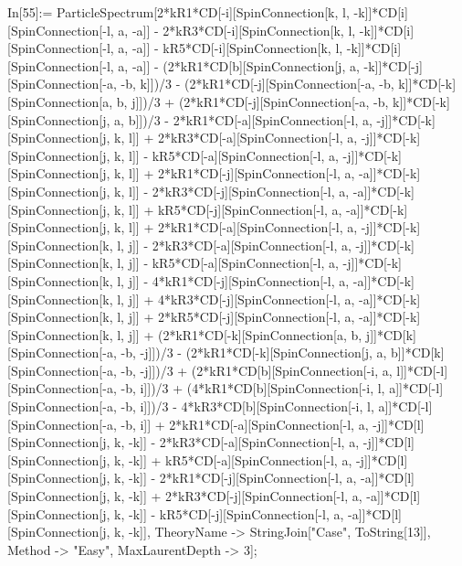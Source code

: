 In[55]:= ParticleSpectrum[2*kR1*CD[-i][SpinConnection[k, l, -k]]*CD[i][SpinConnection[-l, a, -a]] - 2*kR3*CD[-i][SpinConnection[k, l, -k]]*CD[i][SpinConnection[-l, a, -a]] - kR5*CD[-i][SpinConnection[k, l, -k]]*CD[i][SpinConnection[-l, a, -a]] - (2*kR1*CD[b][SpinConnection[j, a, -k]]*CD[-j][SpinConnection[-a, -b, k]])/3 - (2*kR1*CD[-j][SpinConnection[-a, -b, k]]*CD[-k][SpinConnection[a, b, j]])/3 + (2*kR1*CD[-j][SpinConnection[-a, -b, k]]*CD[-k][SpinConnection[j, a, b]])/3 - 2*kR1*CD[-a][SpinConnection[-l, a, -j]]*CD[-k][SpinConnection[j, k, l]] + 2*kR3*CD[-a][SpinConnection[-l, a, -j]]*CD[-k][SpinConnection[j, k, l]] - kR5*CD[-a][SpinConnection[-l, a, -j]]*CD[-k][SpinConnection[j, k, l]] + 2*kR1*CD[-j][SpinConnection[-l, a, -a]]*CD[-k][SpinConnection[j, k, l]] - 2*kR3*CD[-j][SpinConnection[-l, a, -a]]*CD[-k][SpinConnection[j, k, l]] + kR5*CD[-j][SpinConnection[-l, a, -a]]*CD[-k][SpinConnection[j, k, l]] + 2*kR1*CD[-a][SpinConnection[-l, a, -j]]*CD[-k][SpinConnection[k, l, j]] - 2*kR3*CD[-a][SpinConnection[-l, a, -j]]*CD[-k][SpinConnection[k, l, j]] - kR5*CD[-a][SpinConnection[-l, a, -j]]*CD[-k][SpinConnection[k, l, j]] - 4*kR1*CD[-j][SpinConnection[-l, a, -a]]*CD[-k][SpinConnection[k, l, j]] + 4*kR3*CD[-j][SpinConnection[-l, a, -a]]*CD[-k][SpinConnection[k, l, j]] + 2*kR5*CD[-j][SpinConnection[-l, a, -a]]*CD[-k][SpinConnection[k, l, j]] + (2*kR1*CD[-k][SpinConnection[a, b, j]]*CD[k][SpinConnection[-a, -b, -j]])/3 - (2*kR1*CD[-k][SpinConnection[j, a, b]]*CD[k][SpinConnection[-a, -b, -j]])/3 + (2*kR1*CD[b][SpinConnection[-i, a, l]]*CD[-l][SpinConnection[-a, -b, i]])/3 + (4*kR1*CD[b][SpinConnection[-i, l, a]]*CD[-l][SpinConnection[-a, -b, i]])/3 - 4*kR3*CD[b][SpinConnection[-i, l, a]]*CD[-l][SpinConnection[-a, -b, i]] + 2*kR1*CD[-a][SpinConnection[-l, a, -j]]*CD[l][SpinConnection[j, k, -k]] - 2*kR3*CD[-a][SpinConnection[-l, a, -j]]*CD[l][SpinConnection[j, k, -k]] + kR5*CD[-a][SpinConnection[-l, a, -j]]*CD[l][SpinConnection[j, k, -k]] - 2*kR1*CD[-j][SpinConnection[-l, a, -a]]*CD[l][SpinConnection[j, k, -k]] + 2*kR3*CD[-j][SpinConnection[-l, a, -a]]*CD[l][SpinConnection[j, k, -k]] - kR5*CD[-j][SpinConnection[-l, a, -a]]*CD[l][SpinConnection[j, k, -k]], TheoryName -> StringJoin["Case", ToString[13]], Method -> "Easy", MaxLaurentDepth -> 3]; 